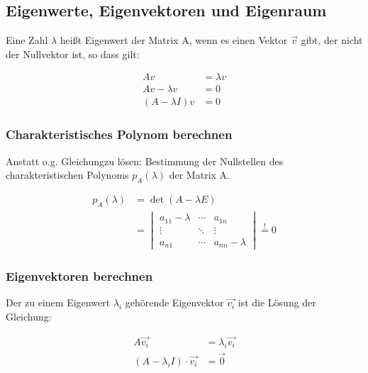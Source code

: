 
\subsection{Eigenwerte, Eigenvektoren und Eigenraum}

Eine Zahl \(\lambda\) heißt Eigenwert der Matrix A, wenn es einen Vektor \(\vec{v}\) gibt, der nicht der Nullvektor ist, so dass gilt:

\begin{equation*}
    \begin{split}
        A v &= \lambda v \\
        A v - \lambda v &= 0 \\
        (A - \lambda I) v &= 0
    \end{split}
\end{equation*}


\subsubsection{Charakteristisches Polynom berechnen}
Anstatt o.g. Gleichungzu lösen: Bestimmung der Nullstellen des charakteristischen Polynoms \(p_A(\lambda)\) der Matrix A.

\begin{equation*}
    \begin{split}
    p_A(\lambda) & = \det(A - \lambda E) \\
    & = \begin{vmatrix}
    a_{11} - \lambda & \cdots & a_{1n} \\
    \vdots & \ddots & \vdots \\
    a_{n1} & \cdots & a_{nn} - \lambda
    \end{vmatrix} \overset{!}{=} 0
    \end{split}
\end{equation*}

\subsubsection{Eigenvektoren berechnen}
Der zu einem Eigenwert \(\lambda_i\) gehörende Eigenvektor \(\vec{v_i}\) ist die Lösung der Gleichung:

\begin{equation*}
    \begin{split}
        A\vec{v_i} &= \lambda_i \vec{v_i} \\
        (A - \lambda_i I) \cdot \vec{v_i} &= \vec{0}
    \end{split}
\end{equation*}

